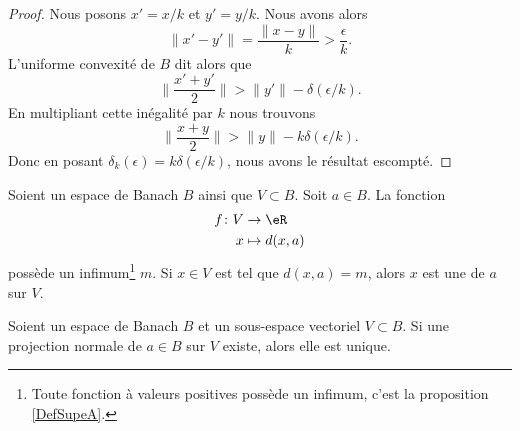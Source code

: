 \begin{proof}
	Nous posons \( x'=x/k\) et \( y'=y/k\). Nous avons alors
	\begin{equation}
		\| x'-y' \|=\frac{ \| x-y \| }{ k }>\frac{ \epsilon }{ k }.
	\end{equation}
	L'uniforme convexité de \( B\) dit alors que
	\begin{equation}
		\| \frac{ x'+y' }{2} \|>\| y' \|-\delta(\epsilon/k).
	\end{equation}
	En multipliant cette inégalité par \( k\) nous trouvons
	\begin{equation}
		\| \frac{ x+y }{2} \|>\| y \|-k\delta(\epsilon/k).
	\end{equation}
	Donc en posant \( \delta_k(\epsilon)=k\delta(\epsilon/k)\), nous avons le résultat escompté.
\end{proof}

\begin{definition}      \label{DEFooMYYLooJyACPL}
	Soient un espace de Banach \( B\) ainsi que \( V\subset B\). Soit \( a\in B\). La fonction
	\begin{equation}
		\begin{aligned}
			f\colon V & \to \eR        \\
			x         & \mapsto d(x,a)
		\end{aligned}
	\end{equation}
	possède un infimum\footnote{Toute fonction à valeurs positives possède un infimum, c'est la proposition \ref{DefSupeA}.} \( m\). Si \( x\in V\) est tel que \( d(x,a)=m\), alors \( x\) est une  de \( a\) sur \( V\).
\end{definition}

\begin{proposition}       \label{PROPooDKXVooUoYPgz}
	Soient un espace de Banach \( B\) et un sous-espace vectoriel \( V\subset B\). Si une projection normale de \( a\in B\) sur \( V\) existe, alors elle est unique.
\end{proposition}

